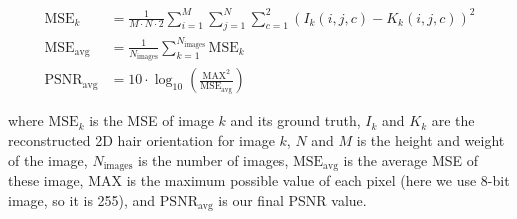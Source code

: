 \documentclass[12pt]{article}
\begin{document}
\begin{align*}
    \text{MSE}_k &= \frac{1}{M \cdot N \cdot 2} \sum_{i=1}^M \sum_{j=1}^N \sum_{c=1}^2 \left(I_k (i,j,c) - K_k(i,j,c) \right)^2 \\
    \text{MSE}_\text{avg} &= \frac{1}{N_\text{images}} \sum_{k=1}^{N_\text{images}}\text{MSE}_k \\
    \text{PSNR}_\text{avg} &= 10 \cdot \log_{10} \left( \frac{\text{MAX}^2}{\text{MSE}_{\text{avg}}} \right)
\end{align*}

where $\text{MSE}_k$ is the MSE of image $k$ and its ground truth, $I_k$ and $K_k$ are the reconstructed 2D hair orientation for image $k$, $N$ and $M$ is the height and weight of the image, $N_\text{images}$ is the number of images, $\text{MSE}_\text{avg}$ is the average MSE of these image, MAX is the maximum possible value of each pixel (here we use 8-bit image, so it is 255), and $\text{PSNR}_\text{avg}$ is our final PSNR value.
\end{document}
